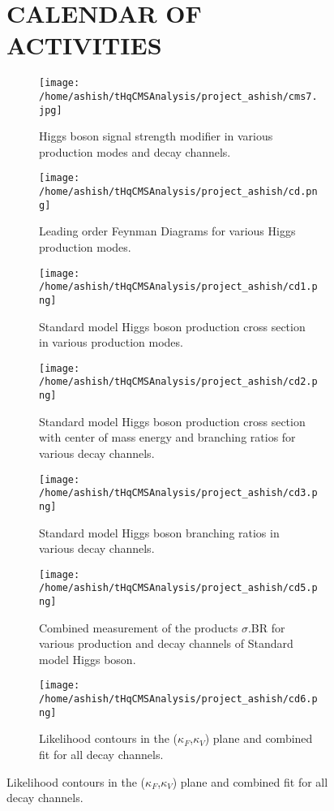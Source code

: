 \documentclass[final,3p]{CSP}
\begin{document}
\begin{figure}
\section{CALENDAR OF ACTIVITIES}

\newpage
\cleanpage


\begin{figure}
  \centering
   \texttt{[image: /home/ashish/tHqCMSAnalysis/project\_ashish/cms7.jpg]}
  \caption{Higgs boson signal strength modifier in various production modes and decay channels.}
   \label{figure 9}
\end{figure}

\begin{figure}
  \centering
   \texttt{[image: /home/ashish/tHqCMSAnalysis/project\_ashish/cd.png]}
  \caption{Leading order Feynman Diagrams for various Higgs production modes.}
   \label{figure 10}
\end{figure}


\begin{figure}
  \centering
   \texttt{[image: /home/ashish/tHqCMSAnalysis/project\_ashish/cd1.png]}
  \caption{Standard model Higgs boson production cross section in various production modes.}
   \label{figure 11}
\end{figure}

\begin{figure}
  \centering
   \texttt{[image: /home/ashish/tHqCMSAnalysis/project\_ashish/cd2.png]}
  \caption{Standard model Higgs boson production cross section with center of mass energy and branching ratios for various decay channels.}
   \label{figure 12}
\end{figure}

\begin{figure}
  \centering
   \texttt{[image: /home/ashish/tHqCMSAnalysis/project\_ashish/cd3.png]}
  \caption{Standard model Higgs boson branching ratios in various decay channels.}
   \label{figure 13}
\end{figure}


\begin{figure}
  \centering
   \texttt{[image: /home/ashish/tHqCMSAnalysis/project\_ashish/cd5.png]}
  \caption{Combined measurement of the products $\sigma$.BR for various production and decay channels of Standard model Higgs boson.}
   \label{figure 14}
\end{figure}

\begin{figure}
  \centering
   \texttt{[image: /home/ashish/tHqCMSAnalysis/project\_ashish/cd6.png]}
  \caption{Likelihood contours in the ($\kappa_F$,$\kappa_V$) plane and combined fit for all decay channels.}
   \label{figure 15}
\end{figure}



\end{figure}
\end{document}
